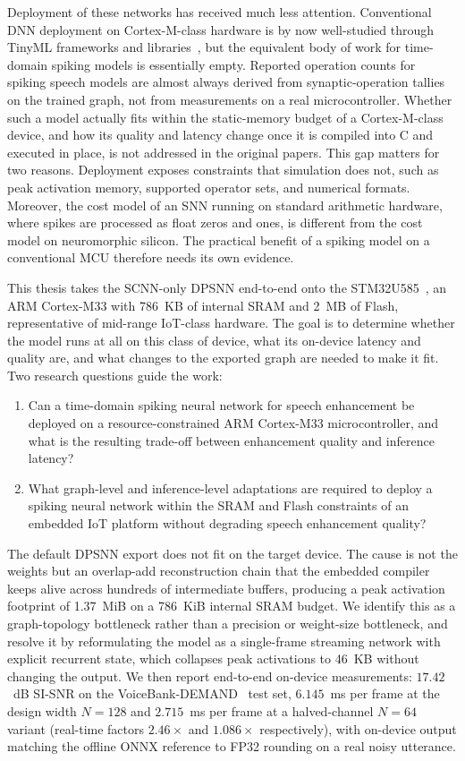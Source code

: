\documentclass[conference]{IEEEtran}
\begin{document}
Deployment of these networks has received much less attention. Conventional DNN deployment on Cortex-M-class hardware is by now well-studied through TinyML frameworks and libraries~\cite{mcunet,tflitemicro,cmsisnn}, but the equivalent body of work for time-domain spiking models is essentially empty. Reported operation counts for spiking speech models are almost always derived from synaptic-operation tallies on the trained graph, not from measurements on a real microcontroller. Whether such a model actually fits within the static-memory budget of a Cortex-M-class device, and how its quality and latency change once it is compiled into C and executed in place, is not addressed in the original papers. This gap matters for two reasons. Deployment exposes constraints that simulation does not, such as peak activation memory, supported operator sets, and numerical formats. Moreover, the cost model of an SNN running on standard arithmetic hardware, where spikes are processed as float zeros and ones, is different from the cost model on neuromorphic silicon. The practical benefit of a spiking model on a conventional MCU therefore needs its own evidence.

This thesis takes the SCNN-only DPSNN end-to-end onto the STM32U585~\cite{stm32u5}, an ARM Cortex-M33 with 786~KB of internal SRAM and 2~MB of Flash, representative of mid-range IoT-class hardware. The goal is to determine whether the model runs at all on this class of device, what its on-device latency and quality are, and what changes to the exported graph are needed to make it fit. Two research questions guide the work:
\begin{enumerate}
    \item Can a time-domain spiking neural network for speech enhancement be deployed on a resource-constrained ARM Cortex-M33 microcontroller, and what is the resulting trade-off between enhancement quality and inference latency?
    \item What graph-level and inference-level adaptations are required to deploy a spiking neural network within the SRAM and Flash constraints of an embedded IoT platform without degrading speech enhancement quality?
\end{enumerate}

The default DPSNN export does not fit on the target device. The cause is not the weights but an overlap-add reconstruction chain that the embedded compiler keeps alive across hundreds of intermediate buffers, producing a peak activation footprint of 1.37~MiB on a 786~KiB  internal SRAM budget. We identify this as a graph-topology bottleneck rather than a precision or weight-size bottleneck, and resolve it by reformulating the model as a single-frame streaming network with explicit recurrent state, which collapses peak activations to 46~KB without changing the output. We then report end-to-end on-device measurements: $17.42$~dB SI-SNR on the VoiceBank-DEMAND~\cite{voicebank} test set, $6.145$~ms per frame at the design width $N{=}128$ and $2.715$~ms per frame at a halved-channel $N{=}64$ variant (real-time factors $2.46\times$ and $1.086\times$ respectively), with on-device output matching the offline ONNX reference to FP32 rounding on a real noisy utterance.
\end{document}
